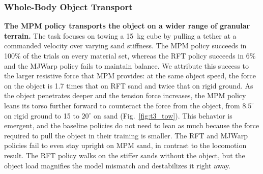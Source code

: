 \subsubsection{Whole-Body Object Transport}
\textbf{The MPM policy transports the object on a wider range of granular terrain.}
The task focuses on towing a 15~kg cube by pulling a tether at a commanded velocity over varying sand stiffness.
The MPM policy succeeds in 100\% of the trials on every material set, whereas the RFT policy succeeds in 6\% and the MJWarp policy fails to maintain balance.
We attribute this success to the larger resistive force that MPM provides: at the same object speed, the force on the object is 1.7 times that on RFT sand and twice that on rigid ground.
As the object penetrates deeper and the tension force increases, the MPM policy leans its torso further forward to counteract the force from the object, from $8.5^\circ$ on rigid ground to 15 to $20^\circ$ on sand (Fig.~\ref{fig:t3_tow}).
This behavior is emergent, and the baseline policies do not need to lean as much because the force required to pull the object in their training is smaller.
The RFT and MJWarp policies fail to even stay upright on MPM sand, in contrast to the locomotion result. 
The RFT policy walks on the stiffer sands without the object, but the object load magnifies the model mismatch and destabilizes it right away.

